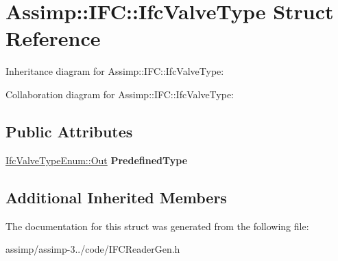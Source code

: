 \hypertarget{struct_assimp_1_1_i_f_c_1_1_ifc_valve_type}{\section{Assimp\+:\+:I\+F\+C\+:\+:Ifc\+Valve\+Type Struct Reference}
\label{struct_assimp_1_1_i_f_c_1_1_ifc_valve_type}
}


Inheritance diagram for Assimp\+:\+:I\+F\+C\+:\+:Ifc\+Valve\+Type\+:


Collaboration diagram for Assimp\+:\+:I\+F\+C\+:\+:Ifc\+Valve\+Type\+:
\subsection*{Public Attributes}
\begin{DoxyCompactItemize}
\item 
\hypertarget{struct_assimp_1_1_i_f_c_1_1_ifc_valve_type_a9245a3cfc7356ec0761d981cf5e96bfd}{\hyperlink{classboost_1_1shared__ptr}{Ifc\+Valve\+Type\+Enum\+::\+Out} {\bfseries Predefined\+Type}}\label{struct_assimp_1_1_i_f_c_1_1_ifc_valve_type_a9245a3cfc7356ec0761d981cf5e96bfd}

\end{DoxyCompactItemize}
\subsection*{Additional Inherited Members}


The documentation for this struct was generated from the following file\+:\begin{DoxyCompactItemize}
\item 
assimp/assimp-\/3../code/I\+F\+C\+Reader\+Gen.\+h\end{DoxyCompactItemize}
